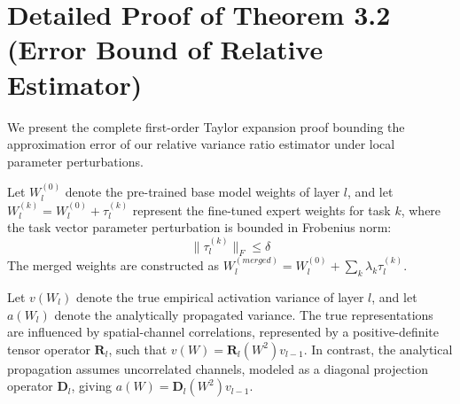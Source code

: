 \documentclass{article}
\theoremstyle{plain}
\theoremstyle{definition}
\theoremstyle{remark}
\begin{document}
\section{Detailed Proof of Theorem 3.2 (Error Bound of Relative Estimator)}
\label{app:proof_error_bound}

We present the complete first-order Taylor expansion proof bounding the approximation error of our relative variance ratio estimator under local parameter perturbations.

Let $W_l^{(0)}$ denote the pre-trained base model weights of layer $l$, and let $W_l^{(k)} = W_l^{(0)} + \tau_l^{(k)}$ represent the fine-tuned expert weights for task $k$, where the task vector parameter perturbation is bounded in Frobenius norm:
\begin{equation}
    \|\tau_l^{(k)}\|_F \le \delta
\end{equation}
The merged weights are constructed as $W_l^{(merged)} = W_l^{(0)} + \sum_k \lambda_k \tau_l^{(k)}$. 

Let $v(W_l)$ denote the true empirical activation variance of layer $l$, and let $a(W_l)$ denote the analytically propagated variance. The true representations are influenced by spatial-channel correlations, represented by a positive-definite tensor operator $\mathbf{R}_l$, such that $v(W) = \mathbf{R}_l(W^2) v_{l-1}$. In contrast, the analytical propagation assumes uncorrelated channels, modeled as a diagonal projection operator $\mathbf{D}_l$, giving $a(W) = \mathbf{D}_l(W^2) v_{l-1}$.
\end{document}
